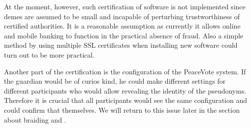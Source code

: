 \documentclass[12pt,a4paper]{article}
\renewcommand{\texttt}[1]{\jlinl{#1}}
\begin{document}
At the moment, however, such certification of software is not implemented since demes are assumed to be small and incapable of perturbing trustworthiness of certified authorities. It is a reasonable assumption as currently it allows online and mobile banking to function in the practical absence of fraud. Also a simple method by using multiple SSL certificates when installing new software could turn out to be more practical.\par
Another part of the certification is the configuration of the PeaceVote system. If the guardian would be of curios kind, he could make different settings for different participants who would allow revealing the identity of the pseudonyms. Therefore it is crucial that all participants would see the same configuration and could confirm that themselves. We will return to this issue later in the section about braiding and \texttt{BraidChain}.\par
\end{document}

